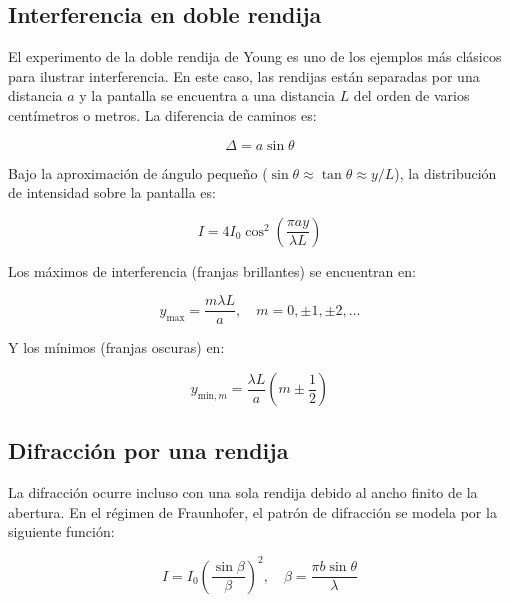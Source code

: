 \documentclass[article,12pt]{elsarticle}
\begin{document}
\subsection*{Interferencia en doble rendija}

El experimento de la doble rendija de Young es uno de los ejemplos más clásicos para ilustrar interferencia. En este caso, las rendijas están separadas por una distancia $a$ y la pantalla se encuentra a una distancia $L$ del orden de varios centímetros o metros. La diferencia de caminos es:

\begin{equation}
\Delta = a \sin \theta \label{eq18}
\end{equation}
\cite{hecht2000optica, barrios2025interferencia}

Bajo la aproximación de ángulo pequeño ($\sin \theta \approx \tan \theta \approx y/L$), la distribución de intensidad sobre la pantalla es:

\begin{equation}
I = 4I_0 \cos^2 \left( \frac{\pi a y}{\lambda L} \right) \label{eq21}
\end{equation}
\cite{barrios2025interferencia}

Los máximos de interferencia (franjas brillantes) se encuentran en:

\begin{equation}
y_{\text{max}} = \frac{m \lambda L}{a}, \quad m = 0, \pm1, \pm2, \ldots \label{eq22}
\end{equation}
\cite{barrios2025interferencia}

Y los mínimos (franjas oscuras) en:

\begin{equation}
y_{\text{min}, m} = \frac{\lambda L}{a} \left(m \pm \frac{1}{2} \right) \label{eq23}
\end{equation}
\cite{barrios2025interferencia}

\subsection*{Difracción por una rendija}

La difracción ocurre incluso con una sola rendija debido al ancho finito de la abertura. En el régimen de Fraunhofer, el patrón de difracción se modela por la siguiente función:

\begin{equation}
I = I_0 \left( \frac{\sin \beta}{\beta} \right)^2, \quad \beta = \frac{\pi b \sin \theta}{\lambda} \label{eq24}
\end{equation}
\cite{pedrotti2018optics, barrios2025interferencia}
\end{document}
